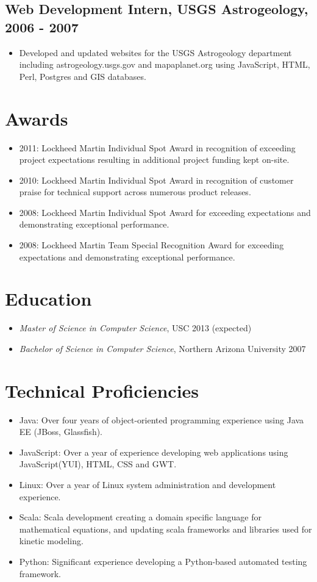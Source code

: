 \documentclass[11pt]{article}
\begin{document}
\subsection*{Web Development Intern, USGS Astrogeology, 2006 - 2007}
\label{sec-1.2}

\begin{itemize}
\item Developed and updated websites for the USGS Astrogeology department including astrogeology.usgs.gov and mapaplanet.org using JavaScript, HTML, Perl, Postgres and GIS databases.
\end{itemize}
\section*{Awards}
\label{sec-2}

\begin{itemize}
\item 2011: Lockheed Martin Individual Spot Award in recognition of exceeding project expectations resulting in additional project funding kept on-site.
\item 2010: Lockheed Martin Individual Spot Award in recognition of customer praise for technical support across numerous product releases.
\item 2008: Lockheed Martin Individual Spot Award for exceeding expectations and demonstrating exceptional performance.
\item 2008: Lockheed Martin Team Special Recognition Award for exceeding expectations and demonstrating exceptional performance.
\end{itemize}
\section*{Education}
\label{sec-3}

\begin{itemize}
\item \emph{Master of Science in Computer Science}, USC 2013 (expected)
\item \emph{Bachelor of Science in Computer Science}, Northern Arizona University 2007
\end{itemize}
\section*{Technical Proficiencies}
\label{sec-4}

\begin{itemize}
\item Java: Over four years of object-oriented programming experience using Java EE (JBoss, Glassfish).
\item JavaScript: Over a year of experience developing web applications using JavaScript(YUI), HTML, CSS and GWT.
\item Linux: Over a year of Linux system administration and development experience.
\item Scala: Scala development creating a domain specific language for mathematical equations, and updating scala frameworks and libraries used for kinetic modeling.
\item Python: Significant experience developing a Python-based automated testing framework.
\end{itemize}
\end{document}
